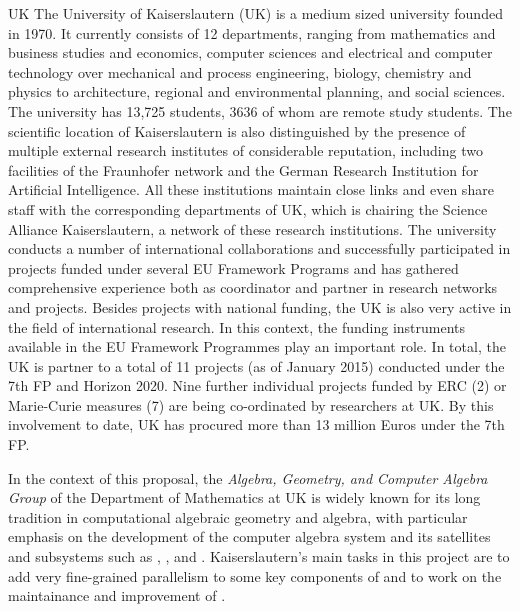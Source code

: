 \begin{sitedescription}{UK}
The University of Kaiserslautern (UK) is a medium sized university founded in 1970. It currently 
consists of 12 departments, ranging from mathematics and business studies and economics, 
computer sciences and electrical and computer technology over mechanical and process engineering, 
biology, chemistry and physics to architecture, regional and environmental planning, and social sciences. 
The university has 13,725 students, 3636 of whom are remote study students. The scientific location 
of Kaiserslautern is also distinguished by the presence of multiple external research institutes of 
considerable reputation, including two facilities of the Fraunhofer network and the German Research 
Institution for Artificial Intelligence. All these institutions maintain close links and even share staff 
with the corresponding departments of UK, which is chairing the Science Alliance Kaiserslautern, 
a network of these research institutions. The university conducts a number of international 
collaborations and successfully participated in projects funded under several EU Framework 
Programs and has gathered comprehensive experience both as coordinator and partner in research 
networks and projects. Besides projects with national funding, the UK is 
also very active in the field of international research. In this context, the funding instruments 
available in the EU Framework Programmes play an important role. In total, the UK is partner 
to a total of 11 projects (as of January 2015) conducted under the 7th FP and Horizon 2020. 
Nine further individual projects funded by ERC (2) or Marie-Curie measures (7) are being co-ordinated 
by researchers at UK. By this involvement to date, UK has procured more than 13 million Euros under the 7th FP.

\medskip In the context of this proposal, the
\emph{Algebra, Geometry, and Computer Algebra Group}  of the Department
of Mathematics at UK is widely known for its long tradition in 
computational algebraic geometry and algebra, with particular emphasis on the 
development of the computer algebra system \Singular and its satellites and  
subsystems such as {}, {}, and {}.
Kaiserslautern's main tasks in this project are to add very fine-grained 
parallelism to some key components of {} and to work
on the maintainance and improvement of \MPIR.


\end{sitedescription}
